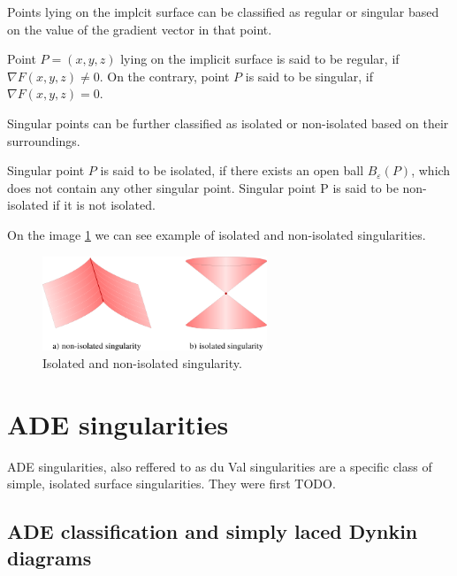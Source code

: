 Points lying on the implcit surface can be classified as regular or
singular based on the value of the gradient vector in that point.

\begin{definition}
    Point $P=(x,y,z)$ lying on the implicit surface is said to be regular,
    if $\nabla F(x, y, z) \neq 0$. On the contrary, point $P$ is said to be 
    singular, if $\nabla F(x, y, z) = 0$.
\end{definition}

Singular points can be further classified as isolated or non-isolated
based on their surroundings.

\begin{definition}
    Singular point $P$ is said to be isolated, if there exists an open ball
    $B_\varepsilon(P)$, which does not contain any other singular point.
    Singular point P is said to be non-isolated if it is not isolated.
\end{definition}

On the image \ref{img:2} we can see example of isolated and non-isolated
singularities.

\begin{figure}
    \centerline{\includegraphics[width=0.6\textwidth]{images/img2}}
    \caption[Isolated and non-isolated singularity]
    {Isolated and non-isolated singularity.}
    \label{img:2}
\end{figure}

\section{ADE singularities}
\label{sub2.2}

ADE singularities, also reffered to as du Val singularities are a specific
class of simple, isolated surface singularities. They were first TODO.

\subsection*{ADE classification and simply laced Dynkin diagrams}
\label{subs2.2.1}


